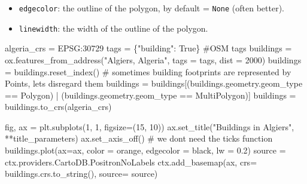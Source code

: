 \documentclass[
  letterpaper,
  DIV=11,
  numbers=noendperiod]{scrreprt}
\newenvironment{Shaded}{\begin{snugshade}}{\end{snugshade}}
\newcommand{\CommentTok}[1]{\textcolor[rgb]{0.37,0.37,0.37}{#1}}
\newcommand{\DecValTok}[1]{\textcolor[rgb]{0.68,0.00,0.00}{#1}}
\newcommand{\FloatTok}[1]{\textcolor[rgb]{0.68,0.00,0.00}{#1}}
\newcommand{\NormalTok}[1]{\textcolor[rgb]{0.00,0.23,0.31}{#1}}
\newcommand{\OperatorTok}[1]{\textcolor[rgb]{0.37,0.37,0.37}{#1}}
\newcommand{\StringTok}[1]{\textcolor[rgb]{0.13,0.47,0.30}{#1}}
\newcommand{\VariableTok}[1]{\textcolor[rgb]{0.07,0.07,0.07}{#1}}
\providecommand{\tightlist}{%
  \setlength{\itemsep}{0pt}\setlength{\parskip}{0pt}}\usepackage{longtable,booktabs,array}
\begin{document}
\begin{itemize}
\tightlist
\item
  \texttt{edgecolor}: the outline of the polygon, by default =
  \texttt{None} (often better).
\item
  \texttt{linewidth}: the width of the outline of the polygon.
\end{itemize}

\begin{Shaded}
\begin{Highlighting}[]
\NormalTok{algeria\_crs }\OperatorTok{=} \StringTok{\textquotesingle{}EPSG:30729\textquotesingle{}}
\NormalTok{tags }\OperatorTok{=}\NormalTok{ \{}\StringTok{"building"}\NormalTok{: }\VariableTok{True}\NormalTok{\} }\CommentTok{\#OSM tags}
\NormalTok{buildings }\OperatorTok{=}\NormalTok{ ox.features\_from\_address(}\StringTok{"Algiers, Algeria"}\NormalTok{, tags }\OperatorTok{=}\NormalTok{ tags, dist }\OperatorTok{=} \DecValTok{2000}\NormalTok{) }
\NormalTok{buildings }\OperatorTok{=}\NormalTok{ buildings.reset\_index()}
 \CommentTok{\# sometimes building footprints are represented by Points, let\textquotesingle{}s disregard them}
\NormalTok{buildings }\OperatorTok{=}\NormalTok{ buildings[(buildings.geometry.geom\_type }\OperatorTok{==} \StringTok{\textquotesingle{}Polygon\textquotesingle{}}\NormalTok{) }\OperatorTok{|}\NormalTok{ (buildings.geometry.geom\_type }\OperatorTok{==} \StringTok{\textquotesingle{}MultiPolygon\textquotesingle{}}\NormalTok{)]}
\NormalTok{buildings }\OperatorTok{=}\NormalTok{ buildings.to\_crs(algeria\_crs)}
\end{Highlighting}
\end{Shaded}

\begin{Shaded}
\begin{Highlighting}[]
\NormalTok{fig, ax }\OperatorTok{=}\NormalTok{ plt.subplots(}\DecValTok{1}\NormalTok{, }\DecValTok{1}\NormalTok{, figsize}\OperatorTok{=}\NormalTok{(}\DecValTok{15}\NormalTok{, }\DecValTok{10}\NormalTok{))}
\NormalTok{ax.set\_title(}\StringTok{"Buildings in Algiers"}\NormalTok{, }\OperatorTok{**}\NormalTok{title\_parameters)}
\NormalTok{ax.set\_axis\_off() }\CommentTok{\# we don\textquotesingle{}t need the ticks function}
\NormalTok{buildings.plot(ax}\OperatorTok{=}\NormalTok{ax, color }\OperatorTok{=} \StringTok{\textquotesingle{}orange\textquotesingle{}}\NormalTok{, edgecolor }\OperatorTok{=} \StringTok{\textquotesingle{}black\textquotesingle{}}\NormalTok{, lw }\OperatorTok{=} \FloatTok{0.2}\NormalTok{)}
\NormalTok{source }\OperatorTok{=}\NormalTok{ ctx.providers.CartoDB.PositronNoLabels}
\NormalTok{ctx.add\_basemap(ax, crs}\OperatorTok{=}\NormalTok{ buildings.crs.to\_string(), source}\OperatorTok{=}\NormalTok{ source)}
\end{Highlighting}
\end{Shaded}
\end{document}
